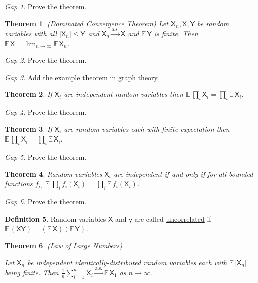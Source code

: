 \documentclass[11pt]{article}
\newcommand{\rv}[1]{\mathsf{#1}}
\newcommand{\ex}{\mathbb{E}\,}
\newcommand{\defname}[1]{\underline{#1}}
\newcommand{\asto}{\xrightarrow{\text{a.s.}}}
\theoremstyle{theorem}
\newtheorem{theorem}{Theorem}[section]
\theoremstyle{definition}
\newtheorem{definition}[theorem]{Definition}
\theoremstyle{remark}
\theoremstyle{step}
\theoremstyle{gap}
\newtheorem*{gap}{Gap}
\begin{document}
\begin{gap}
Prove the theorem.
\end{gap}

\begin{theorem}{(Dominated Convergence Theorem)}
Let \(\rv{X}_n, \rv{X}, \rv{Y}\) be random variables with all \(|\rv{X}_n| \leq \rv{Y}\) and \(\rv{X}_n \asto \rv{X}\) and \(\ex \rv{Y}\) is finite. Then \(\ex \rv{X} = \lim_{n \to \infty} \ex \rv{X}_n\).
\end{theorem}

\begin{gap}
Prove the theorem.
\end{gap}

\begin{gap}
Add the example theorem in graph theory.
\end{gap}

\begin{theorem}
If \(\rv{X}_i\) are independent random variables then \(\ex \prod_i \rv{X}_i = \prod_i \ex \rv{X}_i\).
\end{theorem}

\begin{gap}
Prove the theorem.
\end{gap}

\begin{theorem}
If \(\rv{X}_i\) are random variables each with finite expectation then \(\ex \prod_i \rv{X}_i = \prod_i \ex \rv{X}_i\).
\end{theorem}

\begin{gap}
Prove the theorem.
\end{gap}

\begin{theorem}
Random variables \(\rv{X}_i\) are independent if and only if for all bounded functions \(f_i\), \(\ex \prod_i f_i(\rv{X}_i) = \prod_i \ex f_i(\rv{X}_i)\).
\end{theorem}

\begin{gap}
Prove the theorem.
\end{gap}

\begin{definition}
Random variables \(\rv{X}\) and \(\rv{y}\) are called \defname{uncorrelated} if \(\ex (\rv{X} \rv{Y}) = (\ex \rv{X})(\ex \rv{Y})\).
\end{definition}

\begin{theorem}{(Law of Large Numbers)}\ 

Let \(\rv{X}_n\) be independent identically-distributed random variables each with \(\ex |\rv{X}_n|\) being finite. Then \(\frac{1}{n} \sum_{i=1}^n \rv{X}_i \asto \ex \rv{X}_1\) as \(n \to \infty\).
\end{theorem}
\end{document}
